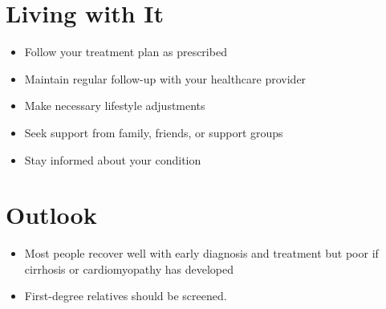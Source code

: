 \section{Living with It}
\begin{itemize}[noitemsep]
  \item Follow your treatment plan as prescribed
  \item Maintain regular follow-up with your healthcare provider
  \item Make necessary lifestyle adjustments
  \item Seek support from family, friends, or support groups
  \item Stay informed about your condition
\end{itemize}
\section{Outlook}
\begin{itemize}[noitemsep]
  \item Most people recover well with early diagnosis and treatment but poor if cirrhosis or cardiomyopathy has developed
  \item First-degree relatives should be screened.
\end{itemize}
